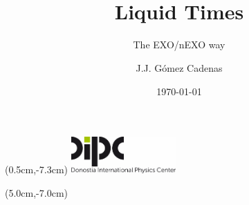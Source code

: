 \documentclass [aspectratio=169]{beamer}
\title[]{\vspace{60pt} \\
Liquid Times} %
\subtitle{The EXO/nEXO way}
\author[]{J.J. Gómez Cadenas}
\institute[]{Donostia International Physics Center}
\date{\today}
\begin{document}
{
\begin{frame}
    \titlepage
    \begin{textblock*}{4cm}(0.5cm,-7.3cm)
        \includegraphics[width=4cm]{dipc.png}
    \end{textblock*}
    \begin{textblock*}{8cm}(5.0cm,-7.0cm)
        \huge {} %
    \end{textblock*}
\end{frame}
}
\end{document}
